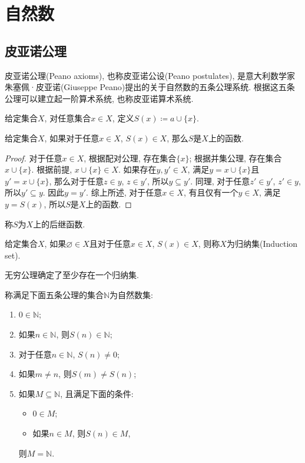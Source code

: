 \chapter{自然数}

\section{皮亚诺公理}
皮亚诺公理(Peano axioms), 也称皮亚诺公设(Peano postulates), 是意大利数学家朱塞佩·皮亚诺(Giuseppe Peano)提出的关于自然数的五条公理系统. 根据这五条公理可以建立起一阶算术系统, 也称皮亚诺算术系统.

\begin{definition}
	给定集合$X$, 对任意集合$x\in X$, 定义$S(x)\coloneqq a\cup \{x\}$.
\end{definition}

\begin{proposition}
	给定集合$X$, 如果对于任意$x\in X$, $S(x)\in X$, 那么$S$是$X$上的函数.
\end{proposition}

\begin{proof}
	对于任意$x\in X$, 根据配对公理, 存在集合$\{x\}$; 根据并集公理, 存在集合$x\cup \{x\}$. 根据前提, $x\cup \{x\}\in X$. 如果存在$y,y' \in X$, 满足$y=x\cup \{x\}$且$y'=x\cup \{x\}$, 那么对于任意$z\in y$, $z\in y'$, 所以$y\subseteq y'$. 同理, 对于任意$z'\in y'$, $z'\in y$, 所以$y'\subseteq y$. 因此$y=y'$. 综上所述, 对于任意$x\in X$, 有且仅有一个$y\in X$, 满足$y=S(x)$, 所以$S$是$X$上的函数.
\end{proof}

称$S$为$X$上的后继函数.

\begin{definition}
	给定集合$X$, 如果$\varnothing \in X$且对于任意$x\in X$, $S(x)\in X$, 则称$X$为归纳集(Induction set).
\end{definition}

无穷公理确定了至少存在一个归纳集.

\begin{axiom}
	称满足下面五条公理的集合$\mathbb N$为自然数集:
	\begin{enumerate}
		\item $0\in \mathbb N$;
		\item 如果$n\in \mathbb N$, 则$S(n)\in \mathbb N$;
		\item 对于任意$n\in \mathbb N$, $S(n)\neq 0$;
		\item 如果$m\neq n$, 则$S(m)\neq S(n)$;
		\item 如果$M\subseteq \mathbb N$, 且满足下面的条件:
			\begin{itemize}
				\item $0\in M$;
				\item 如果$n\in M$, 则$S(n)\in M$,
			\end{itemize}
			则$M=\mathbb N$.
	\end{enumerate}
\end{axiom}

